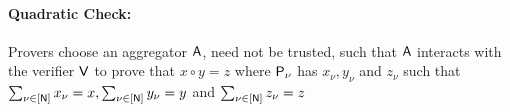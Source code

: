 \paragraph{Quadratic Check: }
Provers choose an aggregator $\mathsf{A}$, need not be trusted, such that $\mathsf{A}$ interacts with the verifier $\mathsf{V}$ to prove that $x \circ y = z$ where $\mathsf{P}_{\nu}$ has $x_{\nu}, y_{\nu}$ and $z_{\nu}$ such that $\sum_{\nu \in [\mathsf{N}]}x_{\nu} = x, \sum_{\nu \in [\mathsf{N}]}y_{\nu} = y$ and $\sum_{\nu \in [\mathsf{N}]}z_{\nu} = z$
\begin{comment}
Then each prover doess the following:
\begin{itemize}
	\item $\prover_{\nu}$ encodes $x_{\nu}, y_{\nu}, z_{\nu}$ in the same way mentioned in subsec:\ref{subsec: encode} and constructs encoded matrix $\ewit_{x_{\nu}}, \ewit_{y_{\nu}}, \ewit_{z_{\nu}}$.
	\item $\prover_{\nu}$ commits to $\ewit_{x_{\nu}}, \ewit_{y_{\nu}}, \ewit_{z_{\nu}}$ in the same way mentioned in subsec:\ref{subsec: commit} and constructs commitment vector $\comoracle_{x_{\nu}}, \comoracle_{y_{\nu}}, \comoracle_{z_{\nu}}$.
\end{itemize}
\end{comment}
